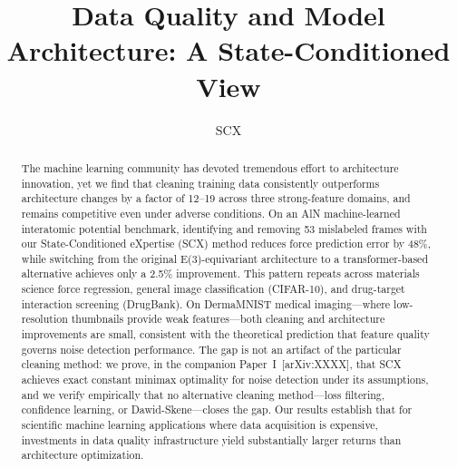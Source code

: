 %

\title{Data Quality and Model Architecture: A State-Conditioned View}

\author{SCX}



\maketitle

\begin{abstract}
The machine learning community has devoted tremendous effort to architecture innovation, yet we find that cleaning training data consistently outperforms architecture changes by a factor of 12--19 across three strong-feature domains, and remains competitive even under adverse conditions. On an AlN machine-learned interatomic potential benchmark, identifying and removing 53 mislabeled frames with our State-Conditioned eXpertise (SCX) method reduces force prediction error by 48\%, while switching from the original E(3)-equivariant architecture to a transformer-based alternative achieves only a 2.5\% improvement. This pattern repeats across materials science force regression, general image classification (CIFAR-10), and drug-target interaction screening (DrugBank). On DermaMNIST medical imaging---where low-resolution thumbnails provide weak features---both cleaning and architecture improvements are small, consistent with the theoretical prediction that feature quality governs noise detection performance. The gap is not an artifact of the particular cleaning method: we prove, in the companion Paper~I~[arXiv:XXXX], that SCX achieves exact constant minimax optimality for noise detection under its assumptions, and we verify empirically that no alternative cleaning method---loss filtering, confidence learning, or Dawid-Skene---closes the gap. Our results establish that for scientific machine learning applications where data acquisition is expensive, investments in data quality infrastructure yield substantially larger returns than architecture optimization.
\end{abstract}

